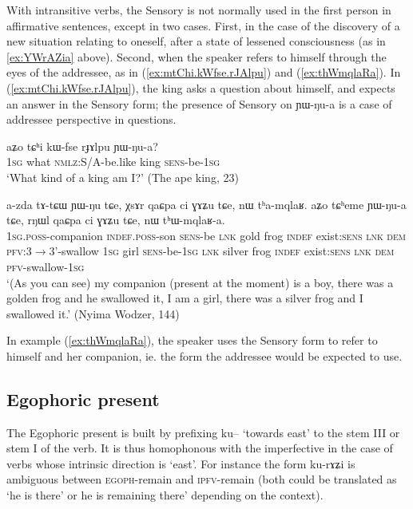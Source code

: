 \documentclass[oldfontcommands,oneside,a4paper,11pt]{article}
\newcommand{\ipa}[1]{{\phon \mbox{#1}}} %
\newcommand{\refb}[1]{(\ref{#1})}
\begin{document}
 With intransitive verbs, the Sensory is not normally used in the first person in affirmative sentences, except in two cases. First, in the case of the discovery of a new situation relating to oneself, after a state of lessened consciousness (as in \ref{ex:YWrAZia} above). Second, when the speaker refers to himself through the eyes of the addressee, as in \refb{ex:mtChi.kWfse.rJAlpu} and \refb{ex:thWmqlaRa}. In \refb{ex:mtChi.kWfse.rJAlpu}, the king asks a question about himself, and expects an answer in the Sensory form; the presence of Sensory on \ipa{ɲɯ-ŋu-a} is a case of addressee perspective in questions.


\begin{exe}
\ex \label{ex:mtChi.kWfse.rJAlpu}
\gll
\ipa{aʑo}  	\ipa{tɕʰi}  	\ipa{kɯ-fse}  	\ipa{rɟɤlpu}  	\ipa{ɲɯ-ŋu-a?}  \\
\textsc{1sg} what \textsc{nmlz}:S/A-be.like king \textsc{sens}-be-\textsc{1sg} \\
\glt `What kind of a king am I?' (The ape  king, 23)
\end{exe}


\begin{exe}
\ex \label{ex:thWmqlaRa}
\gll
\ipa{a-zda}  	\ipa{tɤ-tɕɯ}  	\ipa{ɲɯ-ŋu}  	\ipa{tɕe,}  	\ipa{χsɤr}  	\ipa{qaɕpa}  	\ipa{ci}  	\ipa{ɣɤʑu}  	\ipa{tɕe,}  	\ipa{nɯ}  	\ipa{tʰa-mqlaʁ.} \ipa{aʑo}  	\ipa{tɕʰeme}  	\ipa{ɲɯ-ŋu-a}  	\ipa{tɕe,}  	\ipa{rŋɯl}  	\ipa{qaɕpa}  	\ipa{ci}  	\ipa{ɣɤʑu}  	\ipa{tɕe,}  	\ipa{nɯ}  	\ipa{tʰɯ-mqlaʁ-a.}  \\
\textsc{1sg.poss}-companion \textsc{indef.poss}-son \textsc{sens}-be  \textsc{lnk} gold frog \textsc{indef} exist:\textsc{sens} \textsc{lnk} \textsc{dem} \textsc{pfv}:3$\rightarrow$3'-swallow \textsc{1sg} girl \textsc{sens}-be-\textsc{1sg}  \textsc{lnk} silver frog \textsc{indef} exist:\textsc{sens} \textsc{lnk} \textsc{dem} \textsc{pfv}-swallow-\textsc{1sg} \\
\glt `(As you can see) my companion (present at the moment) is a boy, there was a golden frog and he swallowed it, I am a girl, there was a silver frog and I swallowed it.' (Nyima Wodzer, 144)
\end{exe}

In example \refb{ex:thWmqlaRa}, the speaker uses the Sensory form to refer to himself and her companion, ie. the form the addressee would be expected to use. 


\subsection{Egophoric present } \label{sec:egoph}
The Egophoric present  is built by prefixing \ipa{ku--} `towards east' to the stem III or stem I of the verb. It is thus homophonous with the imperfective in the case of verbs whose intrinsic direction is `east'.  For instance the form \ipa{ku-rɤʑi} is ambiguous between \textsc{egoph}-remain and \textsc{ipfv}-remain (both could be translated as `he is there' or he is remaining there' depending on the context).
\end{document}

